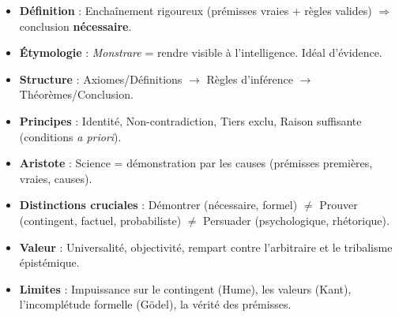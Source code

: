 \documentclass[11pt]{article}
\begin{document}
\begin{aretenir}
\begin{itemize}
    \item \textbf{Définition} : Enchaînement rigoureux (prémisses vraies + règles valides) $\Rightarrow$ conclusion \textbf{nécessaire}.
    \item \textbf{Étymologie} : \emph{Monstrare} = rendre visible à l'intelligence. Idéal d'évidence.
    \item \textbf{Structure} : Axiomes/Définitions $\rightarrow$ Règles d'inférence $\rightarrow$ Théorèmes/Conclusion.
    \item \textbf{Principes} : Identité, Non-contradiction, Tiers exclu, Raison suffisante (conditions \emph{a priori}).
    \item \textbf{Aristote} : Science = démonstration par les causes (prémisses premières, vraies, causes).
    \item \textbf{Distinctions cruciales} : Démontrer (nécessaire, formel) $\neq$ Prouver (contingent, factuel, probabiliste) $\neq$ Persuader (psychologique, rhétorique).
    \item \textbf{Valeur} : Universalité, objectivité, rempart contre l'arbitraire et le tribalisme épistémique.
    \item \textbf{Limites} : Impuissance sur le contingent (Hume), les valeurs (Kant), l'incomplétude formelle (Gödel), la vérité des prémisses.
\end{itemize}
\end{aretenir}
\end{document}
